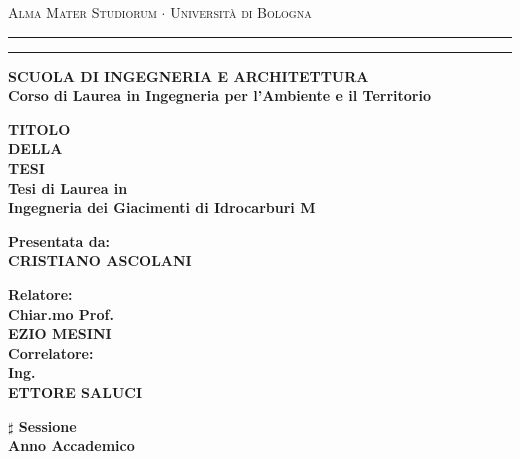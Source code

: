 \begin{titlepage}
\begin{center}
{{\Large{\textsc{Alma Mater Studiorum $\cdot$ Universit\`a di
Bologna}}}} \rule[0.1cm]{\textwidth}{0.1mm}
\rule[0.5cm]{\textwidth}{0.6mm}
{\small{\bf SCUOLA DI INGEGNERIA  E ARCHITETTURA\\
Corso di Laurea in Ingegneria per l'Ambiente e il Territorio}}
\end{center}
\vspace{15mm}
\begin{center}
{\LARGE{\bf TITOLO}}\\
\vspace{3mm}
{\LARGE{\bf DELLA}}\\
\vspace{3mm}
{\LARGE{\bf TESI}}\\
\vspace{19mm} {\large{\bf Tesi di Laurea in \\Ingegneria dei Giacimenti di Idrocarburi M}}
\end{center}
\vspace{30mm}
\par
\noindent
\begin{minipage}[t]{0.47\textwidth}
{\large{\bf Presentata da:\\
CRISTIANO ASCOLANI}}
\end{minipage}
\hfill
\begin{minipage}[t]{0.47\textwidth}\raggedleft
{\large{\bf Relatore:\\
Chiar.mo Prof. \\EZIO MESINI\\}}
\vspace{5mm}
{\large{\bf Correlatore:\\
Ing.\\ ETTORE SALUCI}}
\end{minipage}
\vspace{15mm}
\begin{center}
{\large{\bf $\sharp$ Sessione\\
Anno Accademico }}
\end{center}
\end{titlepage}